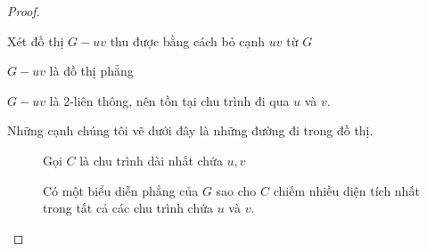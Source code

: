 \begin{proof}
\begin{enumerate}
\begin{tikzpicture}
              \end{tikzpicture}
    \end{enumerate}


    Xét đồ thị $G-uv$ thu được bằng cách bỏ cạnh $uv$ từ $G$

    $G-uv$ là đồ thị phẳng

    $G-uv$ là 2-liên thông, nên tồn tại chu trình đi qua $u$ và $v$.

    \begin{remark}
        Những cạnh chúng tôi vẽ dưới đây là những đường đi trong đồ thị.
    \end{remark}

    \begin{figure}[H]
        \begin{minipage}{0.4\textwidth}
        \end{minipage}
        \hfill
        \begin{minipage}{0.5\textwidth}
            Gọi $C$ là chu trình dài nhất chứa $u,v$
        \end{minipage}

    \end{figure}

    \begin{figure}[H]
        \begin{minipage}{0.4\textwidth}
        \end{minipage}
        \hfill
        \begin{minipage}{0.5\textwidth}
            Có một biểu diễn phẳng của $G$ sao cho $C$ chiếm nhiều diện tích nhất trong tất cả các chu trình chứa $u$ và $v$.
        \end{minipage}


\end{figure}
\end{proof}
